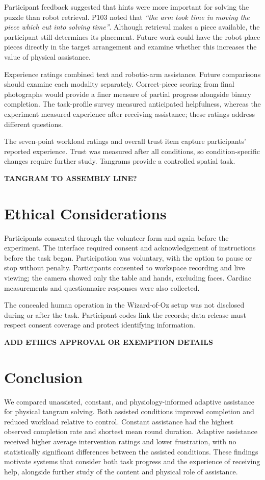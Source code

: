 \documentclass[sigconf,anonymous]{aamas}
\begin{document}
Participant feedback suggested that hints were more important for solving the puzzle than robot retrieval. P103 noted that \textit{``the arm took time in moving the piece which cut into solving time''}. Although retrieval makes a piece available, the participant still determines its placement. Future work could have the robot place pieces directly in the target arrangement and examine whether this increases the value of physical assistance.

Experience ratings combined text and robotic-arm assistance. Future comparisons should examine each modality separately. Correct-piece scoring from final photographs would provide a finer measure of partial progress alongside binary completion. The task-profile survey measured anticipated helpfulness, whereas the experiment measured experience after receiving assistance; these ratings address different questions.

The seven-point workload ratings and overall trust item capture participants' reported experience. Trust was measured after all conditions, so condition-specific changes require further study. Tangrams provide a controlled spatial task.

\textbf{TANGRAM TO ASSEMBLY LINE?}

\section{Ethical Considerations}

Participants consented through the volunteer form and again before the experiment. The interface required consent and acknowledgement of instructions before the task began. Participation was voluntary, with the option to pause or stop without penalty. Participants consented to workspace recording and live viewing; the camera showed only the table and hands, excluding faces. Cardiac measurements and questionnaire responses were also collected.

The concealed human operation in the Wizard-of-Oz setup was not disclosed during or after the task. Participant codes link the records; data release must respect consent coverage and protect identifying information.

\textbf{ADD ETHICS APPROVAL OR EXEMPTION DETAILS}

\section{Conclusion}

We compared unassisted, constant, and physiology-informed adaptive assistance for physical tangram solving. Both assisted conditions improved completion and reduced workload relative to control. Constant assistance had the highest observed completion rate and shortest mean round duration. Adaptive assistance received higher average intervention ratings and lower frustration, with no statistically significant differences between the assisted conditions. These findings motivate systems that consider both task progress and the experience of receiving help, alongside further study of the content and physical role of assistance.
\end{document}
